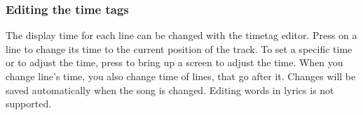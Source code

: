 \subsubsection{Editing the time tags}

The display time for each line can be changed with the timetag editor.
Press \ActionRCWpsBrowse on a line to change its time to the current position of the track.
To set a specific time or to adjust the time, press \ActionStdContext{} to
bring up a screen to adjust the time.
When you change line's time, you also change time of lines, that go after it.
Changes will be saved automatically when the song is changed.
Editing words in lyrics is not supported.
